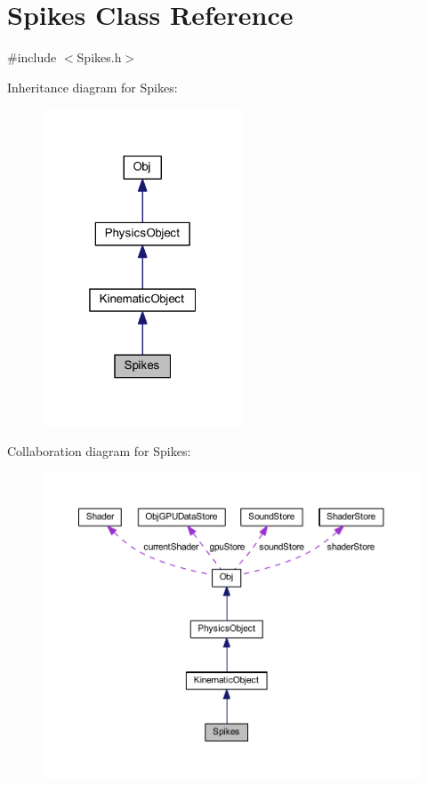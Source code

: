 \hypertarget{class_spikes}{}\section{Spikes Class Reference}
\label{class_spikes}


{\ttfamily \#include $<$Spikes.\+h$>$}



Inheritance diagram for Spikes\+:
\nopagebreak
\begin{figure}[H]
\begin{center}
\leavevmode
\includegraphics[width=169pt]{class_spikes__inherit__graph}
\end{center}
\end{figure}


Collaboration diagram for Spikes\+:
\nopagebreak
\begin{figure}[H]
\begin{center}
\leavevmode
\includegraphics[width=350pt]{class_spikes__coll__graph}
\end{center}
\end{figure}

